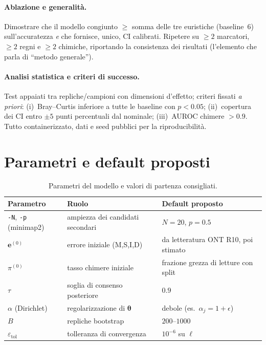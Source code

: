 \documentclass[11pt,a4paper]{article}
\newcommand{\bt}{\boldsymbol{\theta}}
\newcommand{\bpi}{\pi}
\newcommand{\ee}{\mathbf{e}}
\begin{document}
\paragraph{Ablazione e generalit\`a.} Dimostrare che il modello congiunto $\ge$ somma delle tre euristiche (baseline~6) sull'accuratezza \emph{e} che fornisce, unico, CI calibrati. Ripetere su $\ge2$ marcatori, $\ge2$ regni e $\ge2$ chimiche, riportando la consistenza dei risultati (l'elemento che parla di ``metodo generale'').

\paragraph{Analisi statistica e criteri di successo.} Test appaiati tra repliche/campioni con dimensioni d'effetto; criteri fissati \emph{a priori}: (i)~Bray--Curtis inferiore a tutte le baseline con $p<0.05$; (ii)~copertura dei CI entro $\pm5$ punti percentuali dal nominale; (iii)~AUROC chimere $>0.9$. Tutto containerizzato, dati e seed pubblici per la riproducibilit\`a.

\section{Parametri e default proposti}
\begin{table}[h]\centering\small
\begin{tabular}{@{}lll@{}}
\toprule
Parametro & Ruolo & Default proposto\\
\midrule
\texttt{-N}, \texttt{-p} (minimap2) & ampiezza dei candidati secondari & $N{=}20$, $p{=}0.5$\\
$\ee^{(0)}$ & errore iniziale (M,S,I,D) & da letteratura ONT R10, poi stimato\\
$\bpi^{(0)}$ & tasso chimere iniziale & frazione grezza di letture con split\\
$\tau$ & soglia di consenso posteriore & $0.9$\\
$\alpha$ (Dirichlet) & regolarizzazione di $\bt$ & debole (es.\ $\alpha_j{=}1{+}\epsilon$)\\
$B$ & repliche bootstrap & $200$--$1000$\\
$\varepsilon_{\mathrm{tol}}$ & tolleranza di convergenza & $10^{-6}$ su $\ell$\\
\bottomrule
\end{tabular}
\caption{Parametri del modello e valori di partenza consigliati.}
\end{table}
\end{document}
